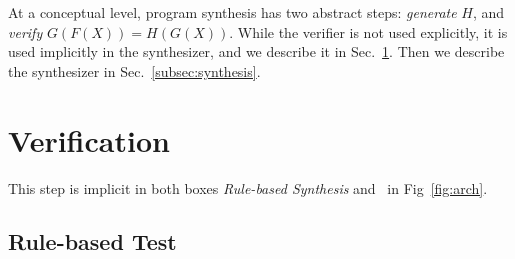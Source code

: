At a conceptual level, program synthesis has two abstract steps: {\em
  generate} $H$, and {\em verify} $G(F(X))=H(G(X))$.  While the
verifier is not used explicitly, it is used implicitly in the
synthesizer, and we describe it in Sec.~\ref{sec:verification}.  Then we
describe the synthesizer in Sec.~\ref{subsec:synthesis}.







\section{Verification}
\label{sec:verification}

%
This step is implicit in both boxes {\em Rule-based Synthesis} and
\cegis\ in Fig~\ref{fig:arch}.
%

\subsection{Rule-based  Test}\label{sec:axiomatic-rewrite}


